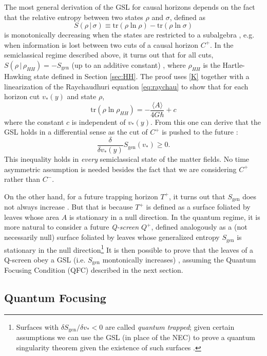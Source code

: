 \documentclass[12pt]{article}
\def\be{\begin{equation}}
\def\ee{\end{equation}}
\begin{document}
The most general derivation of the GSL for causal horizons depends on the fact that the relative entropy between two states $\rho$ and $\sigma$, defined as
\be\label{relS}
S(\rho\,|\,\sigma) \equiv \mathrm{tr}(\rho \ln \rho) - \mathrm{tr}(\rho \ln \sigma)
\ee
is monotonically decreasing when the states are restricted to a subalgebra \cite{Araki:1976zv}, e.g. when information is lost between two cuts of a causal horizon $C^+$.  In the semiclassical regime described above, it turns out that for all cuts, $S(\rho\,|\,\rho_{HH}) = -S_\mathrm{gen}$ (up to an additive constant) \cite{wall2011}, where $\rho_{HH}$ is the Hartle-Hawking state  defined in Section \ref{sec:HH}.  The proof uses \eqref{K} together with a linearization of the Raychaudhuri equation \eqref{eq:raychau} to show that for each horizon cut $v_*(y)$ and state $\rho$,
\be
\mathrm{tr}(\rho \ln \rho_{HH}) = -\frac{\langle A \rangle}{4G\hbar} + c
\ee
where the constant $c$ is independent of $v_*(y)$.  From this one can derive that the GSL holds in a differential sense as the cut of $C^+$ is pushed to the future \cite{wall2011}:
\be\label{GSL}
\frac{\delta}{\delta v_*(y)} S_\mathrm{gen}(v_*) \ge 0.
\ee
This inequality holds in \emph{every} semiclassical state of the matter fields.  No time asymmetric assumption is needed besides the fact that we are considering $C^+$ rather than $C^-$.

On the other hand, for a future trapping horizon $T^+$, it turns out that $S_\mathrm{gen}$ does not always increase \cite{wall2011b}.  But that is because $T^+$ is defined as a surface foliated by leaves whose area $A$ is stationary in a null direction.  In the quantum regime, it is more natural to consider a future \emph{Q-screen} $Q^+$, defined analogously as a (not necessarily null) surface foliated by leaves whose generalized entropy $S_\mathrm{gen}$ is stationary in the null direction\footnote{Surfaces with $\delta S_\mathrm{gen}/{\delta v_*} < 0$ are called \emph{quantum trapped}; given certain assumptions we can use the GSL (in place of the NEC) to prove a quantum singularity theorem given the existence of such surfaces \cite{wall2013generalized}.}  It is then possible to prove that the leaves of a Q-screen obey a GSL (i.e. $S_\mathrm{gen}$ montonically increases) \cite{Bousso:2015eda}, assuming the Quantum Focusing Condition (QFC) described in the next section.

\subsection{Quantum Focusing}
\end{document}
